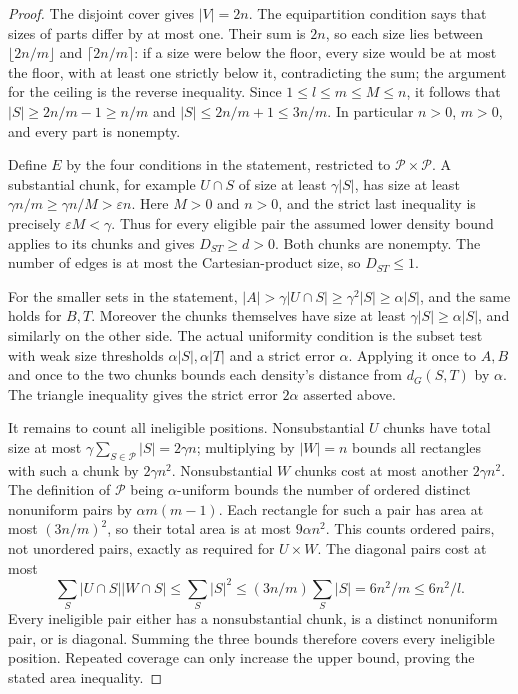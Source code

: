 \begin{proof}
The disjoint cover gives $|V|=2n$. The equipartition condition says
that sizes of parts differ by at most one. Their sum is $2n$, so each
size lies between $\lfloor2n/m\rfloor$ and $\lceil2n/m\rceil$:
if a size were below the floor, every size would be at most the floor,
with at least one strictly below it, contradicting the sum; the
argument for the ceiling is the reverse inequality. Since
$1\leq l\leq m\leq M\leq n$, it follows that
$|S|\geq2n/m-1\geq n/m$ and $|S|\leq2n/m+1\leq3n/m$.
In particular $n>0$, $m>0$, and every part is nonempty.

Define $E$ by the four conditions in the statement, restricted to
$\mathcal P\times\mathcal P$. A substantial chunk, for example
$U\cap S$ of size at least $\gamma|S|$, has size at least
$\gamma n/m\geq\gamma n/M>\varepsilon n$. Here $M>0$ and
$n>0$, and the strict last inequality is precisely
$\varepsilon M<\gamma$. Thus for every eligible pair the assumed
lower density bound applies to its chunks and gives $D_{ST}\geq d>0$.
Both chunks are nonempty. The number of edges is at most the
Cartesian-product size, so $D_{ST}\leq1$.

For the smaller sets in the statement,
$|A|>\gamma|U\cap S|\geq\gamma^2|S|\geq\alpha|S|$, and the
same holds for $B,T$. Moreover the chunks themselves have size at
least $\gamma|S|\geq\alpha|S|$, and similarly on the other side.
The actual uniformity condition is the subset test with weak size
thresholds $\alpha|S|,\alpha|T|$ and a strict error $\alpha$.
Applying it once to $A,B$ and once to the two chunks bounds each
density's distance from $d_G(S,T)$ by $\alpha$. The triangle
inequality gives the strict error $2\alpha$ asserted above.

It remains to count all ineligible positions. Nonsubstantial
$U$ chunks have total size at most
$\gamma\sum_{S\in\mathcal P}|S|=2\gamma n$; multiplying by $|W|=n$
bounds all rectangles with such a chunk by $2\gamma n^2$.
Nonsubstantial $W$ chunks cost at most another $2\gamma n^2$.
The definition of $\mathcal P$ being $\alpha$-uniform bounds the
number of ordered distinct nonuniform pairs by $\alpha m(m-1)$.
Each rectangle for such a pair has area at most $(3n/m)^2$, so
their total area is at most $9\alpha n^2$. This counts ordered
pairs, not unordered pairs, exactly as required for $U\times W$.
The diagonal pairs cost at most
\[
 \sum_S |U\cap S||W\cap S|
 \leq\sum_S|S|^2
 \leq(3n/m)\sum_S|S|=6n^2/m\leq6n^2/l.
\]
Every ineligible pair either has a nonsubstantial chunk, is a
distinct nonuniform pair, or is diagonal. Summing the three bounds
therefore covers every ineligible position. Repeated coverage can
only increase the upper bound, proving the stated area inequality.
\end{proof}
